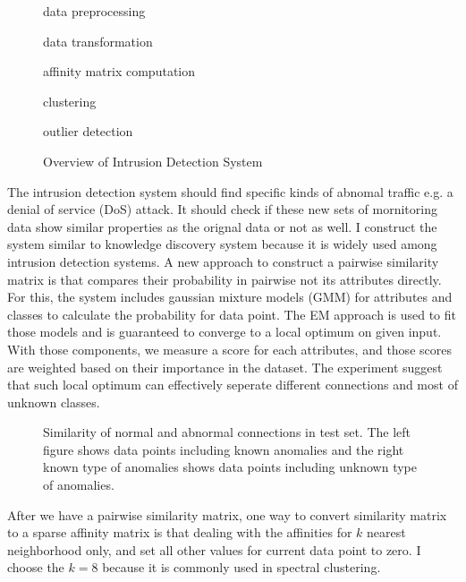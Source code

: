 \begin{figure}[htb2]
\begin{center}
\end{center}
\begin{inparaenum}
\item data preprocessing
\item data transformation
\item affinity matrix computation
\item clustering
\item outlier detection
\end{inparaenum}
\caption{Overview of Intrusion Detection System}
\label{fig:refSingleRobot1}
\end{figure}
The intrusion detection system should find specific kinds of abnomal traffic e.g. a denial of service (DoS) attack. 
It should check if these new sets of mornitoring data show similar properties as the orignal data or not as well. 
I construct the system similar to knowledge discovery system \cite{fayyad96} because it is widely used among intrusion detection systems. 
A new approach to construct a pairwise similarity matrix is that compares their probability in pairwise not its attributes directly. 
For this, the system includes gaussian mixture models (GMM) for attributes and classes to calculate the probability for data point.
The EM approach is used to fit those models and is guaranteed to converge to a local optimum on given input. 
With those components, we measure a score for each attributes, and those scores are weighted based on their importance in the dataset\cite{kayacik05}.
The experiment suggest that such local optimum can effectively seperate different connections and most of unknown classes. 
\begin{figure}[htb2]
\begin{center}
\end{center}
\caption{Similarity of normal and abnormal connections in test set. The left figure shows data points including known anomalies and the right known type of anomalies shows data points including unknown type of anomalies.} %
\label{fig:refSingleRobot1}
\end{figure}

After we have a pairwise similarity matrix, one way to convert similarity matrix to a sparse affinity matrix is that dealing with the affinities for $k$ nearest neighborhood only, and set all other values for current data point to zero. 
I choose the $k = 8$ because it is commonly used in spectral clustering. 

